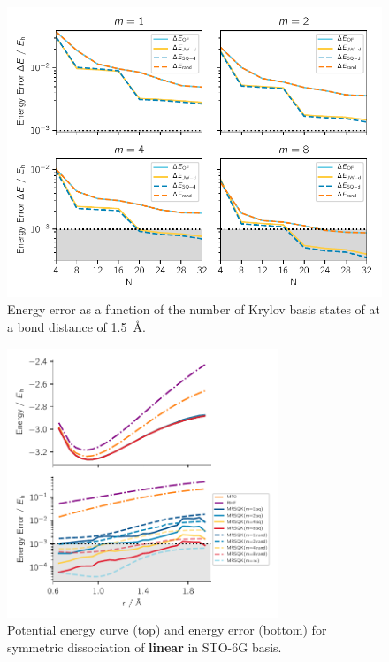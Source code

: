 \documentclass[journal=jctcce,manuscript=article]{achemso}
\begin{document}
\begin{figure}[h!]
  \centering
  \includegraphics[width=4.5in]{figs/h6_error-N_order.pdf}
  \caption{Energy error as a function of the number of Krylov basis states of  at a bond distance of 1.5~\AA.
   }
\label{h2_cir}
\end{figure}
\begin{figure}[h!]
  \centering
  \includegraphics[width=3.2in]{figs/H6_pes_error.pdf}
  \caption{Potential energy curve (top) and energy error (bottom) for symmetric dissociation of \textbf{linear } in STO-6G basis.
   }
\label{h2_cir}
\end{figure}
\end{document}
